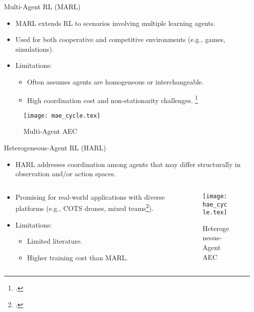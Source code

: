 \documentclass[xcolor={svgnames},aspectratio=169]{beamer}
\begin{document}
\begin{frame}{Multi-Agent RL (MARL)}
    \begin{itemize}
        \item MARL extends RL to scenarios involving multiple learning agents.
        \item Used for both cooperative and competitive environments (e.g., games, simulations).
        \item Limitations:
        \begin{itemize}
            \item Often assumes agents are homogeneous or interchangeable.
            \item High coordination cost and non-stationarity challenges. \footcite{albrecht2024}
        \end{itemize}
    \end{itemize}
    \begin{figure}[!h]
        \centering
        \texttt{[image: mae\_cycle.tex]}
        \caption{Multi-Agent AEC}
        \label{fig:marl_aec}
    \end{figure}
\end{frame}

\begin{frame}{Heterogeneous-Agent RL (HARL)}
    \begin{itemize}
        \item HARL addresses coordination among agents that may differ structurally in
            observation and/or action spaces.
    \end{itemize}
    \begin{columns}
        \begin{column}{.35\textwidth}
            \begin{itemize}
                \item Promising for real-world applications with diverse platforms 
                    (e.g., COTS drones, mixed teams\footcite{guo2024}).
                \item Limitations:
                \begin{itemize}
                    \item Limited literature.
                    \item Higher training cost than MARL.
                \end{itemize}
            \end{itemize}
            \hfil
        \end{column}
        \begin{column}{.6\textwidth}
            \begin{figure}[!h]
                \centering
                \texttt{[image: hae\_cycle.tex]}
                \caption{Heterogeneous-Agent AEC}
                \label{fig:harl_aec}
            \end{figure}
        \end{column}
    \end{columns}
\end{frame}
\end{document}
